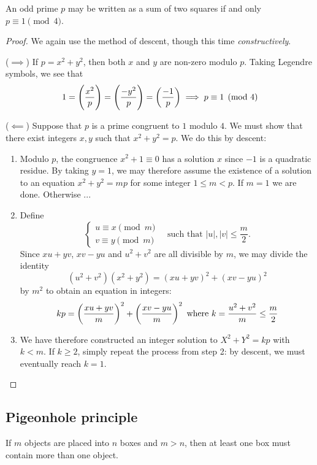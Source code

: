 \begin{exercise}{}{}
An odd prime $p$ may be written as a sum of two squares if and only $p \equiv 1 \pmod 4$.
\end{exercise}

\begin{proof}
We again use the method of descent, though this time \textit{constructively}.

($\implies$) If $p=x^2+y^2$, then both $x$ and $y$ are non-zero modulo $p$. Taking Legendre symbols, we see that
\[ 1=\left(\frac{x^2}{p}\right)=\left(\frac{-y^2}{p}\right)=\left(\frac{-1}{p}\right) \implies p\equiv1\pmod4 \]

($\impliedby$) Suppose that $p$ is a prime congruent to $1$ modulo $4$. We must show that there exist integers $x,y$ such that $x^2+y^2=p$. We do this by descent:
\begin{enumerate}
\item Modulo $p$, the congruence $x^2+1\equiv0$ has a solution $x$ since $-1$ is a quadratic residue. By taking $y=1$, we may therefore assume the existence of a solution to an equation $x^2+y^2=mp$ for some integer $1 \le m<p$. If $m=1$ we are done. Otherwise ...

\item Define
\[ \begin{cases}
u\equiv x\pmod m \\
v\equiv y\pmod m
\end{cases} \quad \text{such that } |u|,|v|\le\frac{m}{2}. \]
Since $xu+yv$, $xv-yu$ and $u^2+v^2$ are all divisible by $m$, we may divide the identity
\[ (u^2+v^2)(x^2+y^2)=(xu+yv)^2+(xv-yu)^2 \]
by $m^2$ to obtain an equation in integers:
\[ kp=\left(\frac{xu+yv}{m}\right)^2+\left(\frac{xv-yu}{m}\right)^2 \text{ where } k=\frac{u^2+v^2}{m}\le\frac{m}{2} \]

\item We have therefore constructed an integer solution to $X^2+Y^2=kp$ with $k<m$. If $k \ge 2$, simply repeat the process from step 2: by descent, we must eventually reach $k=1$.
\end{enumerate}
\end{proof}

\subsection{Pigeonhole principle}
\begin{theorem}
If $m$ objects are placed into $n$ boxes and $m>n$, then at least one box must contain more than one object.
\end{theorem}

